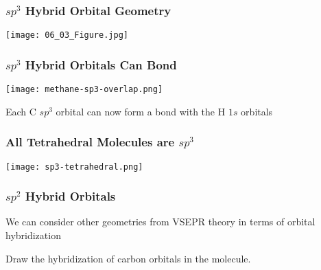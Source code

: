 \documentclass[notes=only]{beamer}
\begin{document}
\begin{frame}\frametitle{$sp^3$ Hybrid Orbital Geometry}
	\begin{center}
		\texttt{[image: 06\_03\_Figure.jpg]}
	\end{center}
\end{frame}

\begin{frame}\frametitle{$sp^3$ Hybrid Orbitals Can Bond}
	\begin{center}
		\texttt{[image: methane-sp3-overlap.png]}
		
	\end{center}

	Each C $sp^3$ orbital can now form a \textsigma{} bond with the H $1s$
	orbitals
\end{frame}

\begin{frame}\frametitle{All Tetrahedral Molecules are $sp^3$ }
	\begin{center}
		\texttt{[image: sp3-tetrahedral.png]}
	\end{center}
\end{frame}

\begin{frame}[t]
	\frametitle{$sp^2$ Hybrid Orbitals}

	We can consider other geometries from VSEPR theory in
	terms of orbital hybridization

	\begin{example}
		Draw the hybridization of carbon orbitals in the 
		molecule.
	\end{example}

\end{frame}
\end{document}
